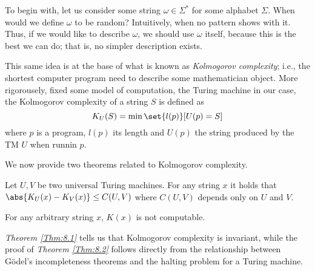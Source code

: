 \documentclass{subfiles}
\begin{document}
    To begin with, let us consider some string \(\omega \in \Sigma^{*}\) for some 
        alphabet \(\Sigma\). When would we define \(\omega\) to be random?
        Intuitively, when no pattern shows with it. Thus,
        if we would like to describe \(\omega\), we should use \(\omega\) itself,
        because this is the best we can do; that is, no simpler description exists.

    This same idea is at the base of what is known as \emph{Kolmogorov complexity};
        i.e., the shortest computer program need to describe some mathematician object.
        More rigorousely, fixed some model of computation, the Turing machine in our case,
        the Kolmogorov complexity of a string \(S\) is defined as 
        \[
            K_{U}(S) = \min \set{l(p)}[U(p) = S]
        \]
        where \(p\) is a program, \(l(p)\) its length and \(U(p)\) the string produced 
        by the TM \(U\) when runnin \(p\).

    We now provide two theorems related to Kolmogorov complexity.
    \begin{theorem}\label{Thm:8.1}
        Let \(U, V\) be two universal Turing machines. For any string \(x\)
        it holds that \(\abs{K_{U}(x) - K_{V}(x)} \le C(U, V)\) where \(C(U, V)\)
        depends only on \(U\) and \(V\).
    \end{theorem}

    \begin{theorem}\label{Thm:8.2}
        For any arbitrary string \(x\), \(K(x)\) is not computable.
    \end{theorem}

    \emph{Theorem \ref{Thm:8.1}} tells us that Kolmogorov complexity is invariant,
        while the proof of \emph{Theorem \ref{Thm:8.2}} follows directly from the relationship 
        between G\"odel's incompleteness theorems and the halting problem for a Turing machine.
\end{document}
